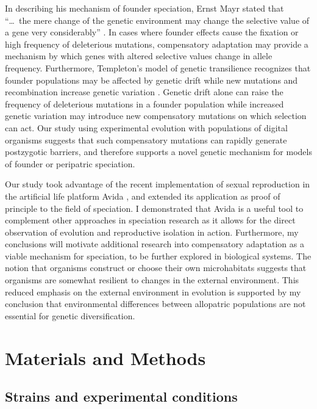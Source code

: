 \begin{doublespace}
In describing his mechanism of founder speciation, Ernst Mayr stated that
``\dots\ the mere change of the genetic environment may change the
selective value of a gene very considerably'' \citep{tem08}.
%
In cases where founder effects cause the fixation or high frequency
of deleterious mutations, compensatory adaptation may provide a
mechanism by which genes with altered selective values change
in allele frequency.
%
Furthermore, Templeton's model of genetic transilience recognizes
that founder populations may be affected by genetic drift
while new mutations and recombination increase genetic variation \citep{tem08}.
%
Genetic drift alone can raise the frequency of deleterious mutations
in a founder population while increased genetic variation
may introduce new compensatory mutations on which selection can act.
%
Our study using experimental evolution with populations of digital organisms
suggests that such compensatory mutations can rapidly generate
postzygotic barriers, and therefore supports a novel genetic mechanism
for models of founder or peripatric speciation.


Our study took advantage
of the recent implementation of sexual reproduction
in the artificial life platform Avida \citep{mis06},
and extended its application
as proof of principle to the field of speciation.
%
I demonstrated that Avida is a useful tool to complement
other approaches in speciation research as it allows for
the direct observation of evolution and reproductive isolation in action.
%
Furthermore, my conclusions will motivate additional research
into compensatory adaptation as a viable mechanism for speciation,
to be further explored in biological systems.
%
The notion that organisms construct or choose
their own microhabitats \citep{lew00}
suggests that organisms are somewhat
resilient to changes in the external environment.
%
This reduced emphasis on the external environment in evolution
is supported by my conclusion that environmental differences
between allopatric populations are not essential for genetic diversification.



\section{Materials and Methods}

\subsection{Strains and experimental conditions}


\end{doublespace}
